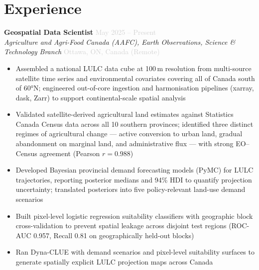 \documentclass[10pt, a4paper]{article}
\newcommand{\dategray}[1]{\textcolor{lightgray}{\small #1}}
\newcommand{\jobtitle}[4]{%
  \noindent\textbf{#1} \hfill \dategray{#3} \\
  \textit{#2} \hfill \dategray{#4} \\[-4pt]
}
\begin{document}
\section{Experience}

\jobtitle{Geospatial Data Scientist}
         {Agriculture and Agri-Food Canada (AAFC), Earth Observations, Science \& Technology Branch}
         {May 2025 – Present}
         {Ottawa, ON, Canada (Remote)}
\begin{itemize}
  \item Assembled a national LULC data cube at 100\,m resolution from
        multi-source satellite time series and environmental covariates
        covering all of Canada south of 60°N; engineered out-of-core
        ingestion and harmonisation pipelines (xarray, dask, Zarr)
        to support continental-scale spatial analysis
  \item Validated satellite-derived agricultural land estimates against
        Statistics Canada Census data across all 10 southern provinces;
        identified three distinct regimes of agricultural change ---
        active conversion to urban land, gradual abandonment on marginal
        land, and administrative flux --- with strong EO–Census agreement
        (Pearson $r = 0.988$)
  \item Developed Bayesian provincial demand forecasting models (PyMC)
        for LULC trajectories, reporting posterior medians and 94\% HDI
        to quantify projection uncertainty; translated posteriors into
        five policy-relevant land-use demand scenarios
  \item Built pixel-level logistic regression suitability classifiers
        with geographic block cross-validation to prevent spatial leakage
        across disjoint test regions
        (ROC-AUC 0.957, Recall 0.81 on geographically held-out blocks)
  \item Ran Dyna-CLUE with demand scenarios and pixel-level suitability
        surfaces to generate spatially explicit LULC projection maps
        across Canada
\end{itemize}

\vspace{6pt}
\end{document}
